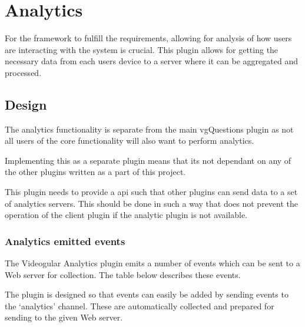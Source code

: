 
\chapter{Analytics} \label{Chapter: Analytics}

For the framework to fulfill the requirements, allowing for analysis of how users are interacting with the system is crucial. This plugin allows for getting the necessary data from each users device to a server where it can be aggregated and processed.

\section{Design}

The analytics functionality is separate from the main vgQuestions plugin as not all users of the core functionality will also want to perform analytics.

Implementing this as a separate plugin means that its not dependant on any of the other plugins written as a part of this project.

This plugin needs to provide a api such that other plugins can send data to a set of analytics servers. This should be done in such a way that does not prevent the operation of the client plugin if the analytic plugin is not available.

\subsection{Analytics emitted events}

The Videogular Analytics plugin emits a number of events which can be sent to a Web server for collection. The table below describes these events.

The plugin is designed so that events can easily be added by sending events to the `analytics' channel. These are automatically collected and prepared for sending to the given Web server.

